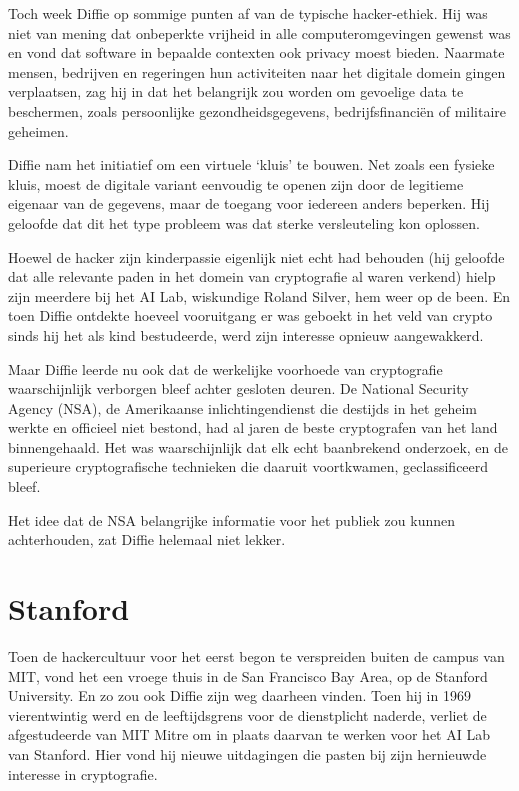 \documentclass[
  a5paper,
  smalldemyvopaper,11pt,twoside,onecolumn,openright,extrafontsizes]{memoir}
\begin{document}
Toch week Diffie op sommige punten af van de typische hacker-ethiek. Hij
was niet van mening dat onbeperkte vrijheid in alle computeromgevingen
gewenst was en vond dat software in bepaalde contexten ook privacy moest
bieden. Naarmate mensen, bedrijven en regeringen hun activiteiten naar
het digitale domein gingen verplaatsen, zag hij in dat het belangrijk
zou worden om gevoelige data te beschermen, zoals persoonlijke
gezondheidsgegevens, bedrijfsfinanciën of militaire geheimen.

Diffie nam het initiatief om een virtuele `kluis' te bouwen. Net zoals
een fysieke kluis, moest de digitale variant eenvoudig te openen zijn
door de legitieme eigenaar van de gegevens, maar de toegang voor
iedereen anders beperken. Hij geloofde dat dit het type probleem was dat
sterke versleuteling kon oplossen.

Hoewel de hacker zijn kinderpassie eigenlijk niet echt had behouden (hij
geloofde dat alle relevante paden in het domein van cryptografie al
waren verkend) hielp zijn meerdere bij het AI Lab, wiskundige Roland
Silver, hem weer op de been. En toen Diffie ontdekte hoeveel vooruitgang
er was geboekt in het veld van crypto sinds hij het als kind
bestudeerde, werd zijn interesse opnieuw aangewakkerd.

Maar Diffie leerde nu ook dat de werkelijke voorhoede van cryptografie
waarschijnlijk verborgen bleef achter gesloten deuren. De National
Security Agency (NSA), de Amerikaanse inlichtingendienst die destijds in
het geheim werkte en officieel niet bestond, had al jaren de beste
cryptografen van het land binnengehaald. Het was waarschijnlijk dat elk
echt baanbrekend onderzoek, en de superieure cryptografische technieken
die daaruit voortkwamen, geclassificeerd bleef.

Het idee dat de NSA belangrijke informatie voor het publiek zou kunnen
achterhouden, zat Diffie helemaal niet lekker.

\section{Stanford}\label{stanford}

Toen de hackercultuur voor het eerst begon te verspreiden buiten de
campus van MIT, vond het een vroege thuis in de San Francisco Bay Area,
op de Stanford University. En zo zou ook Diffie zijn weg daarheen
vinden. Toen hij in 1969 vierentwintig werd en de leeftijdsgrens voor de
dienstplicht naderde, verliet de afgestudeerde van MIT Mitre om in
plaats daarvan te werken voor het AI Lab van Stanford. Hier vond hij
nieuwe uitdagingen die pasten bij zijn hernieuwde interesse in
cryptografie.
\end{document}
